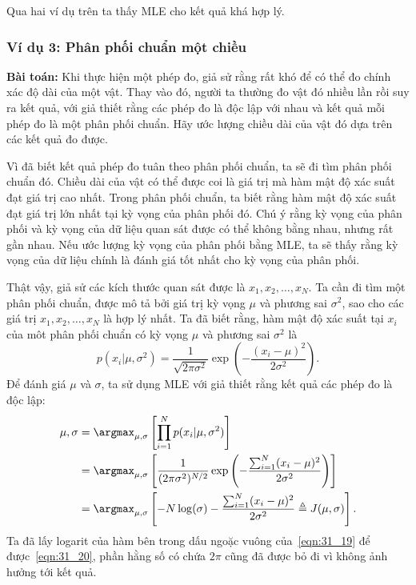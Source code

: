 Qua hai ví dụ trên ta thấy MLE cho kết quả khá hợp lý. 
 
 
\subsubsection{Ví dụ 3: Phân phối chuẩn một chiều}
 \label{sssec:gassian_mle}

\textbf{Bài toán:} Khi thực hiện một phép đo, giả sử rằng rất khó để có thể đo
{chính xác} độ dài của một vật. Thay vào đó, người ta thường đo vật đó
nhiều lần rồi suy ra kết quả, với giả thiết rằng các phép đo là độc lập với nhau
và kết quả mỗi phép đo là một phân phối chuẩn. Hãy ước lượng chiều dài của vật đó
dựa trên các kết quả đo được. 

\lg  
 Vì đã biết kết quả phép đo tuân theo phân phối chuẩn, ta sẽ đi tìm phân phối
chuẩn đó. Chiều dài của vật có thể được coi là giá trị mà hàm mật độ xác suất
đạt giá trị cao nhất. Trong phân phối chuẩn, ta biết rằng hàm mật độ xác suất
đạt giá trị lớn nhất tại kỳ vọng của phân phối đó. Chú ý rằng kỳ vọng của phân
phối và kỳ vọng của dữ liệu quan sát được có thể không bằng nhau, nhưng rất gần
nhau. Nếu ước lượng kỳ vọng của phân phối bằng MLE, ta sẽ thấy rằng kỳ vọng của
dữ liệu chính là đánh giá tốt nhất cho kỳ vọng của phân phối.
 
Thật vậy, giả sử các kích thước quan sát được là $x_1, x_2, \dots, x_N$. Ta cần
đi tìm một phân phối chuẩn, được mô tả bởi giá trị kỳ vọng $\mu$ và phương
sai $\sigma^2$, sao cho các giá trị $x_1, x_2, \dots, x_N$ là hợp lý nhất. Ta đã biết rằng, hàm mật độ xác suất tại $x_i$ của môt phân phối chuẩn có
kỳ vọng $\mu$ và phương sai $\sigma^2$ là
\begin{equation} 
  p(x_i | \mu, \sigma^2) = \frac{1}{\sqrt{2\pi \sigma^2}} \exp\left(-\frac{(x_i - \mu)^2}{2\sigma^2}\right).
\end{equation} 
Để đánh giá $\mu$ và $\sigma$, ta sử dụng MLE với giả thiết rằng kết quả
các phép đo là độc lập:
\begin{alignat}{3}
\label{eqn:31_18}
  \mu, \sigma & = 
  \argmax_{\mu, \sigma} \left[ \prod_{i=1}^N p(x_i | \mu,
  \sigma^2)\right]\\\ 
  \label{eqn:31_19}
  & =  \argmax_{\mu, \sigma} \left[ \frac{1}{(2\pi \sigma^2)^{N/2}} \exp\left(-\frac{\sum_{i=1}^N (x_i - \mu)^2}{2\sigma^2} \right) \right]\\\ 
  \label{eqn:31_20}
  & =  \argmax_{\mu, \sigma}\left[ -N\log(\sigma) - \frac{\sum_{i=1}^N (x_i - \mu)^2}{2\sigma^2} \triangleq J(\mu, \sigma) \right].
\end{alignat} 
Ta đã lấy logarit của hàm bên trong dấu ngoặc vuông của~\eqref{eqn:31_19} để
được~\eqref{eqn:31_20}, phần hằng số có chứa $2\pi$ cũng đã được bỏ đi vì
không ảnh hưởng tới kết quả.
 
